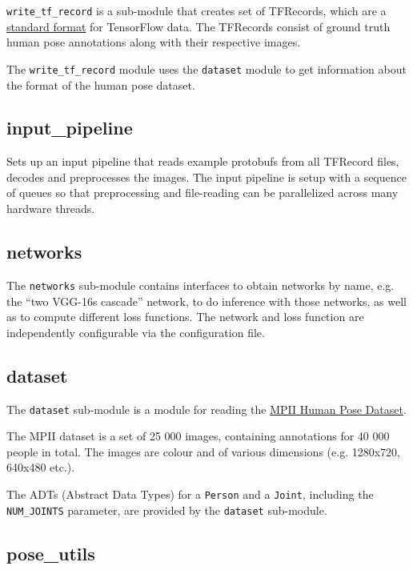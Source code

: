 \documentclass{scrreprt}
\begin{document}
\verb|write_tf_record| is a sub-module that creates set of TFRecords, which are
a \href{https://www.tensorflow.org/programmers_guide/reading_data#file_formats}
{standard format} for TensorFlow data. The TFRecords consist of ground truth
human pose annotations along with their respective images.

The \verb|write_tf_record| module uses the \verb|dataset| module to get
information about the format of the human pose dataset.

\subsection{input\_pipeline}

Sets up an input pipeline that reads example protobufs from all TFRecord files,
decodes and preprocesses the images. The input pipeline is setup with a
sequence of queues so that preprocessing and file-reading can be parallelized
across many hardware threads.

\subsection{networks}

The \verb|networks| sub-module contains interfaces to obtain networks by name,
e.g. the ``two VGG-16s cascade'' network, to do inference with those networks,
as well as to compute different loss functions. The network and loss function
are independently configurable via the configuration file.

\subsection{dataset}

The \verb|dataset| sub-module is a module for reading the
\href{http://human-pose.mpi-inf.mpg.de/}{MPII Human Pose Dataset}.

The MPII dataset is a set of 25 000 images, containing annotations for 40 000
people in total. The images are colour and of various dimensions (e.g.
1280x720, 640x480 etc.).

The ADTs (Abstract Data Types) for a \verb|Person| and a \verb|Joint|,
including the \verb|NUM_JOINTS| parameter, are provided by the \verb|dataset|
sub-module.

\subsection{pose\_utils}
\end{document}
